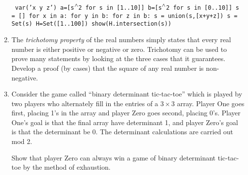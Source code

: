 \begin{enumerate}
{{\tt
var('x y z') \newline
a=[s$\caret$2 for s in [1..10]]  \newline
b=[s$\caret$2 for s in [0..10]]  \newline
s = []  \newline
for x in a:  \newline
\tab for y in b:  \newline
\tab \tab for z in b:  \newline
\tab \tab \tab s = union(s,[x+y+z])  \newline
s = Set(s)  \newline
H=Set([1..100]) \newline
show(H.intersection(s))  \newline
}
}

\wbvfill

\workbookpagebreak

\item The \emph{trichotomy property} of the real 
numbers simply states that every real number is either positive or negative 
or zero.  Trichotomy can be used to prove many statements by looking at the
three cases that it guarantees.  Develop a proof (by cases) that the square of
any real number is non-negative.


\wbvfill

\hintspagebreak

\item Consider the game called ``binary determinant tic-tac-toe'' 
which is played by two players who alternately fill in the entries of a 
$3 \times 3$ array.  Player One goes first, placing 1's in the array and 
player Zero goes second, placing 0's.  Player One's goal is that the 
final array have determinant 1, and player Zero's goal is that the 
determinant be 0.  The determinant calculations are carried out mod 2.

Show that player Zero can always win a game of binary determinant tic-tac-toe
by the method of exhaustion.


\end{enumerate}
